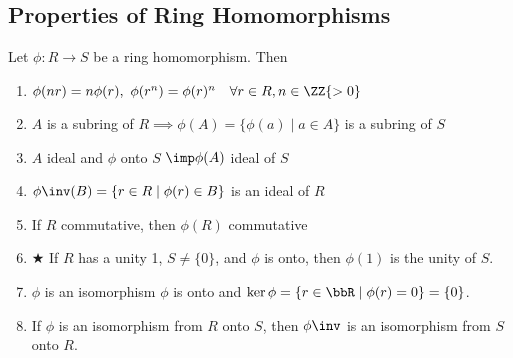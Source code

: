 \subsection{Properties of Ring Homomorphisms}
\begin{theorem}
  Let \( \phi: R\to S \) be a ring homomorphism. Then
  \begin{enumerate}
    \item \( \phi(nr) = n\phi(r),\  \phi(r^n) = \phi(r)^n \quad \forall r\in R, n\in \ZZ{>0} \)
    \item \( A \) is a subring of \( R \implies  \phi(A) = \{\phi(a) \mid a\in A\} \) is a subring of \( S \)
    \item \( A \) ideal and \( \phi \) onto \( S \) \( \imp \phi(A) \) ideal of \( S \)
    \item \( \phi\inv(B) = \{r\in R \mid\phi(r) \in B \} \) is an ideal of \( R \)
    \item If \( R \) commutative, then \( \phi(R) \) commutative
    \item \hspace{-2.75em}$\bigstar$\hspace{1.5em} If \( R \) has a unity 1, \( S\neq \{0\} \), and \( \phi \) is onto, then \( \phi(1) \) is the unity of \( S \).
    \item \( \phi \) is an isomorphism \iff \( \phi \) is onto and \( \ker\phi = \{r\in\bbR \mid\phi(r) = 0\} = \{0\} \).
    \item If \( \phi \) is an isomorphism from \( R \) onto \( S \), then \( \phi\inv \) is an isomorphism from \( S \) onto \( R \).
  \end{enumerate}
\end{theorem}
